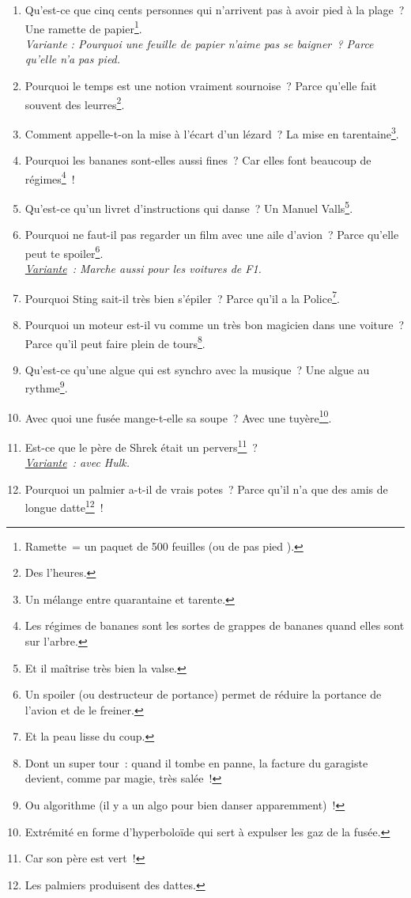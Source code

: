 \documentclass[10pt,a5paper,fullpage]{book}
\begin{document}
\begin{enumerate}
		\item Qu’est-ce que cinq cents personnes qui n’arrivent pas à avoir pied à la plage~? Une ramette de papier\footnote{Ramette = un paquet de 500 feuilles (ou de \guillemotleft pas pied \guillemotright).}.
		\\\textit{Variante : Pourquoi une feuille de papier n’aime pas se baigner~? Parce qu’elle n’a pas pied.}
		\item Pourquoi le temps est une notion vraiment sournoise~? Parce qu’elle fait souvent des leurres\footnote{Des l'heures.}.
		\item Comment appelle-t-on la mise à l’écart d’un lézard~? La mise en tarentaine\footnote{Un mélange entre quarantaine et tarente.}.
		\item Pourquoi les bananes sont-elles aussi fines~? Car elles font beaucoup de régimes\footnote{Les régimes de bananes sont les sortes de grappes de bananes quand elles sont sur l'arbre.}~!
		\item Qu’est-ce qu’un livret d’instructions qui danse~? Un Manuel Valls\footnote{Et il maîtrise très bien la valse.}.
		\item Pourquoi ne faut-il pas regarder un film avec une aile d’avion~? Parce qu’elle peut te spoiler\footnote{Un spoiler (ou destructeur de portance) permet de réduire la portance de l'avion et de le freiner.}. \\\textit{\underline{Variante}~: Marche aussi pour les voitures de F1.}
		\item Pourquoi Sting sait-il très bien s’épiler~? Parce qu’il a la Police\footnote{Et la peau lisse du coup.}. 
		\item Pourquoi un moteur est-il vu comme un très bon magicien dans une voiture~? Parce qu'il peut faire plein de tours\footnote{Dont un super tour~: quand il tombe en panne, la facture du garagiste devient, comme par magie, très salée~!}.
		\item Qu’est-ce qu’une algue qui est synchro avec la musique~? Une algue au rythme\footnote{Ou algorithme (il y a un algo pour bien danser apparemment)~!}.
		\item Avec quoi une fusée mange-t-elle sa soupe~? Avec une tuyère\footnote{Extrémité en forme d’hyperboloïde qui sert à expulser les gaz de la fusée.}.
		\item Est-ce que le père de Shrek était un pervers\footnote{Car son père est vert~!}~? \\\textit{\underline{Variante}~: avec Hulk.}
		\item Pourquoi un palmier a-t-il de vrais potes~? Parce qu’il n’a que des amis de longue datte\footnote{Les palmiers produisent des dattes.}~!

\end{enumerate}
\end{document}
